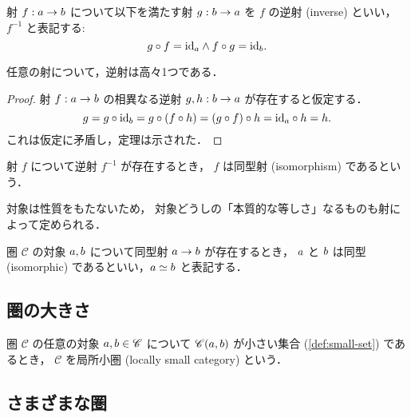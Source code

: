 \documentclass[titlepage]{ltjsreport}
\newcommand{\cat}[1]{\mathscr{#1}}
\newcommand{\obj}[1]{\lowercase{#1}}
\newcommand{\mrp}[3]{{#1}:{#2}\to{#3}}
\newcommand{\mrps}[3]{#1(#2,#3)}
\newcommand{\id}[1]{\mathrm{id}_{#1}}
\begin{document}
\begin{definition}[逆射]
  \def\a{\obj{a}}%
  \def\b{\obj{b}}%
  射 $\mrp{f}{\a}{\b}$ について以下を満たす射 $\mrp{g}{\b}{\a}$ を
  $f$ の逆射 (inverse) といい，
  $f^{-1}$ と表記する:
  \begin{equation}
    g\circ f=\id{\a}\wedge f\circ g=\id{\b}.
  \end{equation}
\end{definition}

\begin{theorem}[逆射の一意性]
  任意の射について，逆射は高々1つである．
\end{theorem}

\begin{proof}
  \def\a{\obj{a}}%
  \def\b{\obj{b}}%
  射 $\mrp{f}{\a}{\b}$ の相異なる逆射 $\mrp{g,h}{\b}{\a}$ が存在すると仮定する．
  \begin{equation*}
    g=g\circ\id{\b}=g\circ(f\circ h)=(g\circ f)\circ h=\id{\a}\circ h=h.
  \end{equation*}
  これは仮定に矛盾し，定理は示された．
\end{proof}

\begin{definition}[同型射]
  射 $f$ について逆射 $f^{-1}$ が存在するとき，
  $f$ は同型射 (isomorphism) であるという．
\end{definition}

対象は性質をもたないため，
対象どうしの「本質的な等しさ」なるものも射によって定められる．

\begin{definition}[同型]
  \def\a{\obj{a}}%
  \def\b{\obj{b}}%
  圏 $\cat{C}$ の対象 $\a,\b$ について同型射 $\a\to\b$ が存在するとき，
  $\a$ と $\b$ は同型 (isomorphic) であるといい，$\a\simeq\b$ と表記する．
\end{definition}

\subsection{圏の大きさ}

\begin{definition}[局所小圏]
  \def\C{\cat{C}}%
  \def\a{\obj{a}}%
  \def\b{\obj{b}}%
  圏 $\C$ の任意の対象 $\a,\b\in\C$ について
  $\mrps{\C}{\a}{\b}$ が小さい集合 (\cref{def:small-set}) であるとき，
  $\C$ を局所小圏 (locally small category) という．
\end{definition}

\subsection{さまざまな圏}
\end{document}
